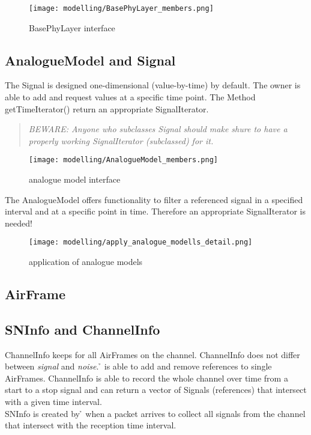 \begin{figure}[h]
 \centering
 \texttt{[image: modelling/BasePhyLayer\_members.png]}
 \caption{BasePhyLayer interface}
 \label{fig: BasePhyLayer interface}
\end{figure}



\subsection{AnalogueModel and Signal}


The Signal is designed one-dimensional (value-by-time) by default. The owner is able
to add and request values at a specific time point.
The Method getTimeIterator() return an appropriate SignalIterator.
\begin{quote}
\emph{BEWARE: Anyone who subclasses Signal should make shure to have a properly
working SignalIterator (subclassed) for it.}
\end{quote}

\begin{figure}[h]
 \centering
 \texttt{[image: modelling/AnalogueModel\_members.png]}
 \caption{analogue model interface}
 \label{fig: analogue model interface}
\end{figure}

The AnalogueModel offers functionality to filter a referenced signal in a specified
interval and at a specific point in time. Therefore an appropriate SignalIterator is needed!

\begin{figure}[h]
 \centering
 \texttt{[image: modelling/apply\_analogue\_modells\_detail.png]}
 \caption{application of analogue models}
 \label{fig: application analogue models}
\end{figure}


\subsection{AirFrame}


\subsection{SNInfo and ChannelInfo}

ChannelInfo keeps for all AirFrames on the channel. ChannelInfo does not differ between \textit{signal} and \textit{noise}. \h{\bp} is able to
add and remove references to single AirFrames.
ChannelInfo is able to record the whole channel over time from a start to a stop signal and can return a vector of Signals (references) that intersect with a given time interval.\\
SNInfo is created by \h{\bp} when a packet arrives to collect all signals from the channel that intersect with the reception time interval.


